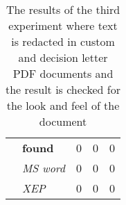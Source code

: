 \begin{table}[h]
\begin{tabular}{llccc}
 & \multicolumn{1}{l|}{\textbf{found}}     & 0                                                                                    & 0                                                                    & 0                                                                                  \\
 & \multicolumn{1}{l|}{\textit{MS word}}   & 0                                                                                    & 0                                                                    & 0                                                                                  \\
 & \multicolumn{1}{l|}{\textit{XEP}}       & 0                                                                                    & 0                                                                    & 0                                                                                 
\end{tabular}
\caption{The results of the third experiment where text is redacted in custom and decision letter PDF documents and the result is checked for the look and feel of the document}
\end{table}

